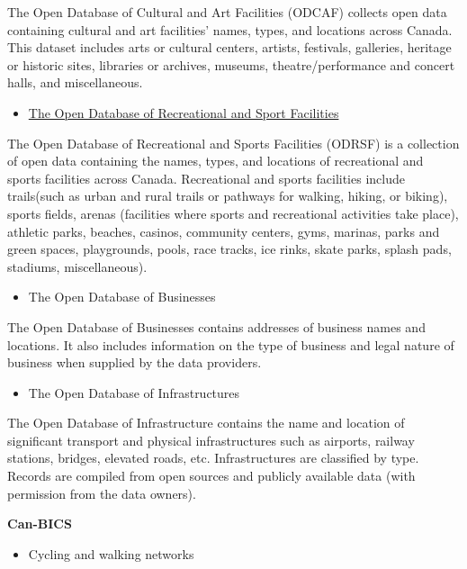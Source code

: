 \documentclass[
11pt, %
oneside, %
english, %
singlespacing, %
]{macthesis} %
\def\tightlist{}
\begin{document}
The Open Database of Cultural and Art Facilities (ODCAF) collects open data containing cultural and art facilities' names, types, and locations across Canada. This dataset includes arts or cultural centers, artists, festivals, galleries, heritage or historic sites, libraries or archives, museums, theatre/performance and concert halls, and miscellaneous.

\begin{itemize}
\tightlist
\item
  \href{https://www.statcan.gc.ca/en/lode/databases/odrsf}{The Open Database of Recreational and Sport Facilities}
\end{itemize}

The Open Database of Recreational and Sports Facilities (ODRSF) is a collection of open data containing the names, types, and locations of recreational and sports facilities across Canada. Recreational and sports facilities include trails(such as urban and rural trails or pathways for walking, hiking, or biking), sports fields, arenas (facilities where sports and recreational activities take place), athletic parks, beaches, casinos, community centers, gyms, marinas, parks and green spaces, playgrounds, pools, race tracks, ice rinks, skate parks, splash pads, stadiums, miscellaneous).

\begin{itemize}
\tightlist
\item
  The Open Database of Businesses
\end{itemize}

The Open Database of Businesses contains addresses of business names and locations. It also includes information on the type of business and legal nature of business when supplied by the data providers.

\begin{itemize}
\tightlist
\item
  The Open Database of Infrastructures
\end{itemize}

The Open Database of Infrastructure contains the name and location of significant transport and physical infrastructures such as airports, railway stations, bridges, elevated roads, etc. Infrastructures are classified by type. Records are compiled from open sources and publicly available data (with permission from the data owners).

\newpage

\textbf{Can-BICS}

\begin{itemize}
\tightlist
\item
  Cycling and walking networks
\end{itemize}
\end{document}
